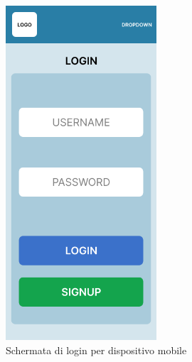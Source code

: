 \begin{figure}[H]
    \centering
    \begin{minipage}{0.45\textwidth}
        \centering
        \includegraphics[width=0.5\textwidth]{img/figma/AndroidLarge-1.png} \caption{Schermata di login per dispositivo mobile}
        \label{fig:androidLogin}
    \end{minipage}\hfill
    \begin{minipage}{0.45\textwidth}
        \centering

\end{minipage}
\end{figure}
